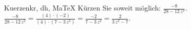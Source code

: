 \begin{MAufgabe}{Kuerzen}{kr, dh, MaTeX}
K\"urzen Sie soweit m\"oglich: $\frac{-8}{28 - 12\, z^2}$.\\ 
\ifLsg\MLoesung
\quad $\frac{-8}{28 - 12\, z^2}=\frac{(4)\cdot(-2)}{(4)\cdot(7 - 3\, z^2)}=\frac{-2}{7 - 3\, z^2}=\frac{2}{3\, z^2 - 7}$.\else\relax\fi
 \end{MAufgabe}